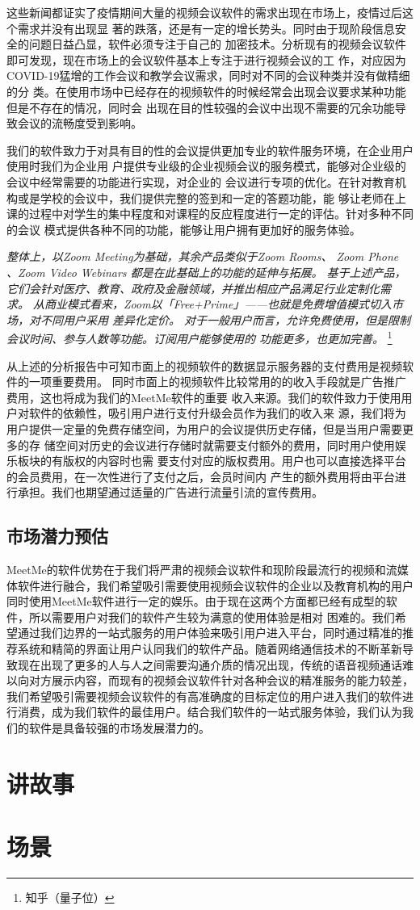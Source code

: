 \documentclass[a4paper,12pt]{article}
\begin{document}
    这些新闻都证实了疫情期间大量的视频会议软件的需求出现在市场上，疫情过后这个需求并没有出现显
    著的跌落，还是有一定的增长势头。同时由于现阶段信息安全的问题日益凸显，软件必须专注于自己的
    加密技术。分析现有的视频会议软件即可发现，现在市场上的会议软件基本上专注于进行视频会议的工
    作，对应因为COVID-19猛增的工作会议和教学会议需求，同时对不同的会议种类并没有做精细的分
    类。在使用市场中已经存在的视频软件的时候经常会出现会议要求某种功能但是不存在的情况，同时会
    出现在目的性较强的会议中出现不需要的冗余功能导致会议的流畅度受到影响。

    我们的软件致力于对具有目的性的会议提供更加专业的软件服务环境，在企业用户使用时我们为企业用
    户提供专业级的企业视频会议的服务模式，能够对企业级的会议中经常需要的功能进行实现，对企业的
    会议进行专项的优化。在针对教育机构或是学校的会议中，我们提供完整的签到和一定的答题功能，能
    够让老师在上课的过程中对学生的集中程度和对课程的反应程度进行一定的评估。针对多种不同的会议
    模式提供各种不同的功能，能够让用户拥有更加好的服务体验。

    \textit{整体上，以Zoom Meeting为基础，其余产品类似于Zoom Rooms、 Zoom Phone 、Zoom
    Video Webinars 都是在此基础上的功能的延伸与拓展。
    基于上述产品，它们会针对医疗、教育、政府及金融领域，并推出相应产品满足行业定制化需
    求。
    从商业模式看来，Zoom以「Free+Prime」——也就是免费增值模式切入市场，对不同用户采用
    差异化定价。
    对于一般用户而言，允许免费使用，但是限制会议时间、参与人数等功能。订阅用户能够使用的
    功能更多，也更加完善。}
    \footnote{知乎（量子位）}

    从上述的分析报告中可知市面上的视频软件的数据显示服务器的支付费用是视频软件的一项重要费用。
    同时市面上的视频软件比较常用的的收入手段就是广告推广费用，这也将成为我们的MeetMe软件的重要
    收入来源。我们的软件致力于使用用户对软件的依赖性，吸引用户进行支付升级会员作为我们的收入来
    源，我们将为用户提供一定量的免费存储空间，为用户的会议提供历史存储，但是当用户需要更多的存
    储空间对历史的会议进行存储时就需要支付额外的费用，同时用户使用娱乐板块的有版权的内容时也需
    要支付对应的版权费用。用户也可以直接选择平台的会员费用，在一次性进行了支付之后，会员时间内
    产生的额外费用将由平台进行承担。我们也期望通过适量的广告进行流量引流的宣传费用。
    \subsection{市场潜力预估}
    MeetMe的软件优势在于我们将严肃的视频会议软件和现阶段最流行的视频和流媒体软件进行融合，我们希望吸引需要使用视频会议软件的企业以及教育机构的用户同时使用MeetMe软件进行一定的娱乐。由于现在这两个方面都已经有成型的软件，所以需要用户对我们的软件产生较为满意的使用体验是相对
    困难的。我们希望通过我们边界的一站式服务的用户体验来吸引用户进入平台，同时通过精准的推荐系统和精简的界面让用户认同我们的软件产品。随着网络通信技术的不断革新导致现在出现了更多的人与人之间需要沟通介质的情况出现，传统的语音视频通话难以向对方展示内容，而现有的视频会议软件针对各种会议的精准服务的能力较差，我们希望吸引需要视频会议软件的有高准确度的目标定位的用户进入我们的软件进行消费，成为我们软件的最佳用户。结合我们软件的一站式服务体验，我们认为我们的软件是具备较强的市场发展潜力的。
    \section{讲故事}
    \section{场景}
\end{document}
